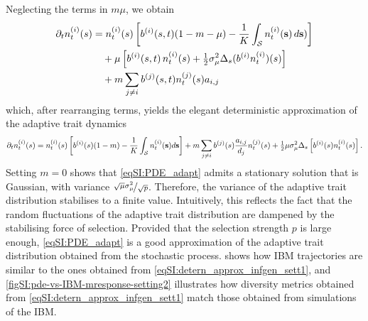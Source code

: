 Neglecting the terms in $m \mu$, we obtain
%
\begin{equation}
  \begin{split}
    \partial_t n_t^{(i)}(s) &= n_t^{(i)}(s)\left[b^{(i)}(s,t)(1-m - \mu) - \frac{1}{K} \int_\mathcal{S} n_t^{(i)}({\textbf s}) \, d {\textbf s})\right] \\
    & \quad + \mu \left[ b^{(i)}(s,t) \, n_t^{(i)}(s) + \tfrac{1}{2} \sigma_\mu^2 \Delta_s (b^{(i)} n_t^{(i)})(s) \right] \\
    & \quad + m \sum_{j \neq i} b^{(j)}(s,t) n_t^{(j)}(s) a_{i,j}
    \end{split}
\end{equation}
which, after rearranging terms, yields the elegant deterministic approximation of the adaptive trait dynamics
%
\begin{equation}\label{eqSI:PDE_adapt}
  \partial_t n_t^{(i)}(s) =n_t^{(i)} (s) \left[b^{(i)}(s)(1-m) -  \frac{1}{K}\int_\mathcal{S}  n_t^{(i)}({\textbf s}) d{\textbf s}  \right] + m \sum_{j\neq i} b^{(j)}(s) \frac{a_{i,j}}{d_j} n_t^{(j)}(s) + \tfrac{1}{2} \mu \sigma_\mu^2 \Delta_s \left[ b^{(i)}(s) n^{(i)}_t(s) \right].
\end{equation}
%
Setting $m = 0$ \citep{Mirrahimi2020} shows that \cref{eqSI:PDE_adapt} admits a stationary solution that is Gaussian, with variance $ \nicefrac{\sqrt{\mu} \sigma_\mu^2}{\sqrt{p}}$. 
%
Therefore, the variance of the adaptive trait distribution stabilises to a finite value. Intuitively, this reflects the fact that the random fluctuations of the adaptive trait distribution are dampened by the stabilising force of selection. Provided that the selection strength $p$ is large enough, \cref{eqSI:PDE_adapt} is a good approximation of the adaptive trait distribution obtained from the stochastic process.
%
 shows how IBM trajectories are similar to the ones obtained from \cref{eqSI:detern_approx_infgen_sett1}, and \cref{figSI:pde-vs-IBM-mresponse-setting2} illustrates how diversity metrics obtained from \cref{eqSI:detern_approx_infgen_sett1} match those obtained from simulations of the IBM.


